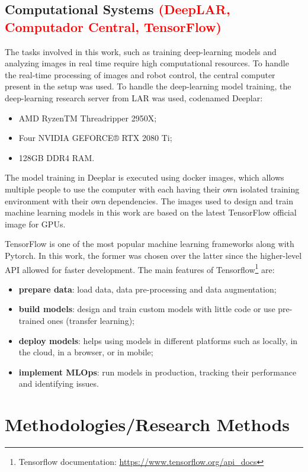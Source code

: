\subsection{Computational Systems \textcolor{red}{(DeepLAR, Computador Central, TensorFlow)}}

The tasks involved in this work, such as training deep-learning models and analyzing images in real time require high computational resources. To handle the real-time processing of images and robot control, the central computer present in the setup was used. To handle the deep-learning model training, the deep-learning research server from LAR was used, codenamed Deeplar:
\begin{itemize}
    \item AMD RyzenTM Threadripper 2950X;
    \item Four NVIDIA GEFORCE® RTX 2080 Ti;
    \item 128GB DDR4 RAM.
\end{itemize}

The model training in Deeplar is executed using docker images, which allows multiple people to use the computer with each having their own isolated training environment with their own dependencies. The images used to design and train machine learning models in this work are based on the latest TensorFlow official image for GPUs.

TensorFlow is one of the most popular machine learning frameworks along with Pytorch. In this work, the former was chosen over the latter since the higher-level API allowed for faster development. The main features of Tensorflow\footnote{Tensorflow documentation: \url{https://www.tensorflow.org/api_docs}} are:
\begin{itemize}
    \item \textbf{prepare data}: load data, data pre-processing and data augmentation;
    \item \textbf{build models}: design and train custom models with little code or use pre-trained ones (transfer learning);
    \item \textbf{deploy models}: helps using models in different platforms such as locally, in the cloud, in a browser, or in mobile;
    \item \textbf{implement MLOps}: run models in production, tracking their performance and identifying issues.
\end{itemize}

\section{Methodologies/Research Methods}

